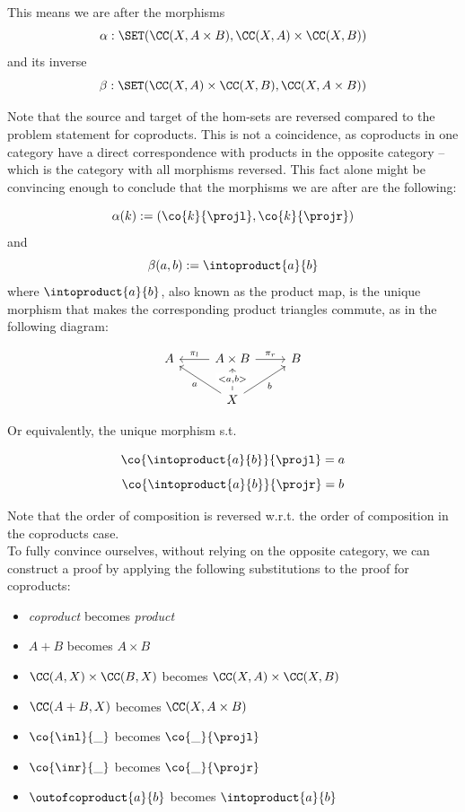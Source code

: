 \begin{solution}\label{sol:product-represent}
\newcommand{\CP}{\CC(A+B,X)}
\newcommand{\CQ}{\CC(A,X)\times\CC(B,X)}
\newcommand{\PP}{\CC(X,A\times B)}
\newcommand{\PQ}{\CC(X,A)\times\CC(X,B)}
  
This means we are after the morphisms \[\alpha:\SET(\PP, \PQ)\] and its inverse \[\beta:\SET(\PQ, \PP)\]

Note that the source and target of the hom-sets are reversed compared to the problem statement for coproducts. This is not a coincidence, as coproducts in one category have a direct correspondence with products in the opposite category -- which is the category with all morphisms reversed. This fact alone might be convincing enough to conclude that the morphisms we are after are the following:

\[\alpha(k):=(\co {k} {\projl}, \co {k} {\projr})\] and \[\beta(a,b) := \intoproduct{a}{b}\] where $\intoproduct{a}{b}$, also known as the product map, is the unique morphism that makes the corresponding product triangles commute, as in the following diagram:

\[
\begin{tikzcd}
A & A\times B \arrow[r, "\pi_r"] \arrow[l, "\pi_l"']                    & B \\
  & X \arrow[u, "{<a,b>}" description] \arrow[ru, "b"'] \arrow[lu, "a"] &  
\end{tikzcd}
\]

Or equivalently, the unique morphism s.t. 

\begin{equation}
\label{ga2}
    \co {\intoproduct{a}{b}} {\projl} = a
\end{equation}
\begin{equation}
\label{gb2}
    \co {\intoproduct{a}{b}} {\projr} = b
\end{equation}

Note that the order of composition is reversed w.r.t. the order of composition in the coproducts case.\\

To fully convince ourselves, without relying on the opposite category, we can construct a proof by applying the following substitutions to the proof for coproducts:

\begin{itemize}
    \item \textit{coproduct} becomes \textit{product}
    \item $A+B$ becomes $A\times B$
    \item $\CQ$ becomes $\PQ$
    \item $\CP$ becomes $\PP$
    \item $\co {\inl} {\_}$ becomes $\co {\_} {\projl}$
    \item $\co {\inr} {\_}$ becomes $\co {\_} {\projr}$
    \item $\outofcoproduct{a}{b}$ becomes $\intoproduct{a}{b}$
\end{itemize}
\end{solution}

